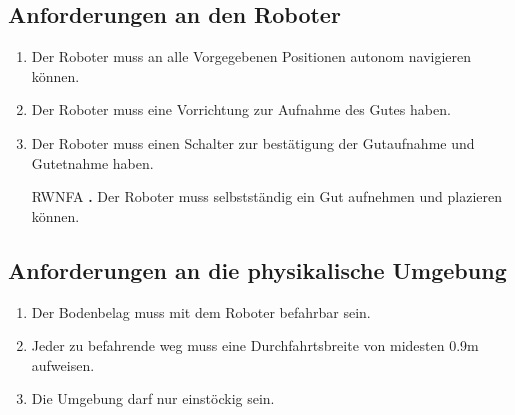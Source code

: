 \subsection{Anforderungen an den Roboter}
\begin{enumerate}[nosep,style=sameline]
\renewcommand{\labelenumi}{RNFA \textbf{\theenumi.}}
\item Der Roboter muss an alle Vorgegebenen Positionen autonom navigieren können.
\item Der Roboter muss eine Vorrichtung zur Aufnahme des Gutes haben.
\item Der Roboter muss einen Schalter zur bestätigung der Gutaufnahme und Gutetnahme haben.
\item[RWNFA \textbf{\theenumi.}] Der Roboter muss selbstständig ein Gut aufnehmen und plazieren können.
\end{enumerate}

\subsection{Anforderungen an die physikalische Umgebung}
\begin{enumerate}[nosep,style=sameline]
\renewcommand{\labelenumi}{ENFA \textbf{\theenumi.}}
\item Der Bodenbelag muss mit dem Roboter befahrbar sein.
\item Jeder zu befahrende weg muss eine Durchfahrtsbreite von midesten 0.9m aufweisen.
\item Die Umgebung darf nur einstöckig sein.
\end{enumerate}




